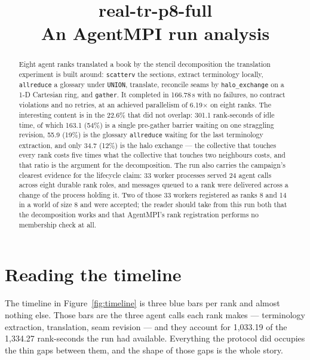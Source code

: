 \documentclass[11pt]{article}
\title{\textbf{real-tr-p8-full}\\[2pt]\large An AgentMPI run analysis}
\author{}
\date{}
\begin{document}
\maketitle

\begin{abstract}
Eight agent ranks translated a book by the stencil decomposition the translation
experiment is built around: \texttt{scatterv} the sections, extract terminology locally,
\texttt{allreduce} a glossary under \texttt{UNION}, translate, reconcile seams by
\texttt{halo\_exchange} on a 1-D Cartesian ring, and \texttt{gather}. It completed in
166.78\,s with no failures, no contract violations and no retries, at an achieved
parallelism of 6.19$\times$ on eight ranks. The interesting content is in the 22.6\%
that did not overlap: 301.1 rank-seconds of idle time, of which 163.1 (54\%) is a single
pre-gather barrier waiting on one straggling revision, 55.9 (19\%) is the glossary
\texttt{allreduce} waiting for the last terminology extraction, and only 34.7 (12\%) is
the halo exchange --- the collective that touches every rank costs five times what the
collective that touches two neighbours costs, and that ratio is the argument for the
decomposition. The run also carries the campaign's clearest evidence for the lifecycle
claim: 33 worker processes served 24 agent calls across eight durable rank roles, and
messages queued to a rank were delivered across a change of the process holding it. Two
of those 33 workers registered as ranks 8 and 14 in a world of size 8 and were accepted;
the reader should take from this run both that the decomposition works and that
AgentMPI's rank registration performs no membership check at all.
\end{abstract}



\section{Reading the timeline}

The timeline in Figure~\ref{fig:timeline} is three blue bars per rank and almost nothing
else. Those bars are the three agent calls each rank makes --- terminology extraction,
translation, seam revision --- and they account for 1{,}033.19 of the 1{,}334.27
rank-seconds the run had available. Everything the protocol did occupies the thin gaps
between them, and the shape of those gaps is the whole story.
\end{document}

